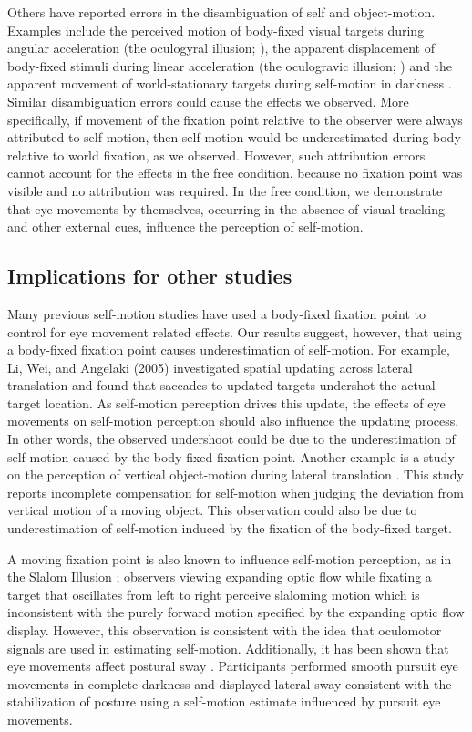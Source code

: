 Others have reported errors in the disambiguation of self and object-motion. Examples include the perceived motion of body-fixed visual targets during angular acceleration (the oculogyral illusion; \cite{carriot2011}), the apparent displacement of body-fixed stimuli during linear acceleration (the oculogravic illusion; \cite{graybiel1952}) and the apparent movement of world-stationary targets during self-motion in darkness \cite{dyde2008}. Similar disambiguation errors could cause the effects we observed. More specifically, if movement of the fixation point relative to the observer were always attributed to self-motion, then self-motion would be underestimated during body relative to world fixation, as we observed. However, such attribution errors cannot account for the effects in the free condition, because no fixation point was visible and no attribution was required. In the free condition, we demonstrate that eye movements by themselves, occurring in the absence of visual tracking and other external cues, influence the perception of self-motion.

\subsection{Implications for other studies}

Many previous self-motion studies have used a body-fixed fixation point to control for eye movement related effects. Our results suggest, however, that using a body-fixed fixation point causes underestimation of self-motion. For example, Li, Wei, and Angelaki \citeyear{li2005a} (2005) investigated spatial updating across lateral translation and found that saccades to updated targets undershot the actual target location. As self-motion perception drives this update, the effects of eye movements on self-motion perception should also influence the updating process. In other words, the observed undershoot could be due to the underestimation of self-motion caused by the body-fixed fixation point. Another example is a study on the perception of vertical object-motion during lateral translation \cite{dokka2013}. This study reports incomplete compensation for self-motion when judging the deviation from vertical motion of a moving object. This observation could also be due to underestimation of self-motion induced by the fixation of the body-fixed target. 

A moving fixation point is also known to influence self-motion perception, as in the Slalom Illusion \cite{freeman2000}; observers viewing expanding optic flow while fixating a target that oscillates from left to right perceive slaloming motion which is inconsistent with the purely forward motion specified by the expanding optic flow display. However, this observation is consistent with the idea that oculomotor signals are used in estimating self-motion. Additionally, it has been shown that eye movements affect postural sway \cite{glasauer2005}.  Participants performed smooth pursuit eye movements in complete darkness and displayed lateral sway consistent with the stabilization of posture using a self-motion estimate influenced by pursuit eye movements.

